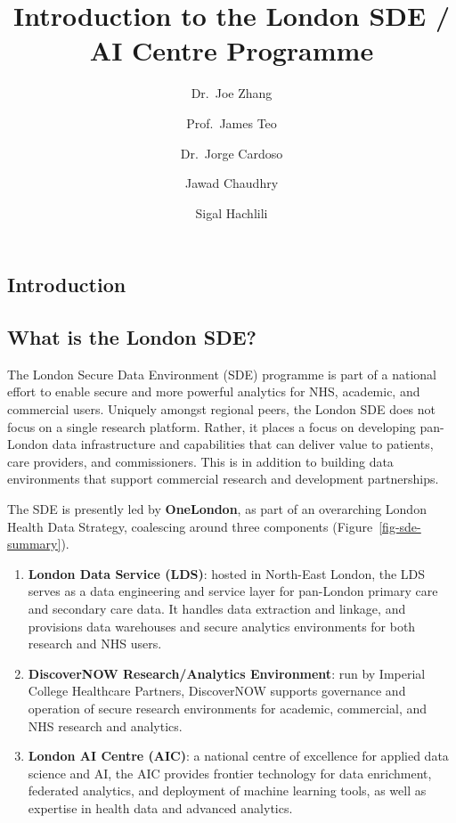 \documentclass[
  letterpaper,
  DIV=11,
  numbers=noendperiod]{scrartcl}
\title{Introduction to the London SDE / AI Centre Programme}
\author{Dr.~Joe Zhang \and Prof.~James Teo \and Dr.~Jorge
Cardoso \and Jawad Chaudhry \and Sigal Hachlili}
\date{}
\begin{document}
\maketitle

\subsection{Introduction}\label{introduction}

\subsection{What is the London SDE?}\label{what-is-the-london-sde}

The London Secure Data Environment (SDE) programme is part of a national
effort to enable secure and more powerful analytics for NHS, academic,
and commercial users. Uniquely amongst regional peers, the London SDE
does not focus on a single research platform. Rather, it places a focus
on developing pan-London data infrastructure and capabilities that can
deliver value to patients, care providers, and commissioners. This is in
addition to building data environments that support commercial research
and development partnerships.

The SDE is presently led by \textbf{OneLondon}, as part of an
overarching London Health Data Strategy, coalescing around three
components (Figure~\ref{fig-sde-summary}).

\begin{enumerate}
\def\labelenumi{(\arabic{enumi})}
\item
  \textbf{London Data Service (LDS)}: hosted in North-East London, the
  LDS serves as a data engineering and service layer for pan-London
  primary care and secondary care data. It handles data extraction and
  linkage, and provisions data warehouses and secure analytics
  environments for both research and NHS users.
\item
  \textbf{DiscoverNOW Research/Analytics Environment}: run by Imperial
  College Healthcare Partners, DiscoverNOW supports governance and
  operation of secure research environments for academic, commercial,
  and NHS research and analytics.
\item
  \textbf{London AI Centre (AIC)}: a national centre of excellence for
  applied data science and AI, the AIC provides frontier technology for
  data enrichment, federated analytics, and deployment of machine
  learning tools, as well as expertise in health data and advanced
  analytics.
\end{enumerate}
\end{document}
